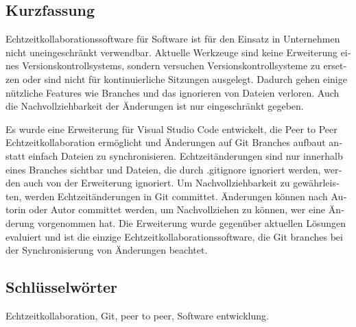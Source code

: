 
\cleardoublepage
{}




\begin{otherlanguage}{ngerman}

  \chapter*{Kurzfassung}

  Echtzeitkollaborationssoftware für Software ist für den Einsatz in Unternehmen nicht uneingeschränkt verwendbar. Aktuelle Werkzeuge sind keine Erweiterung eines Versionskontrollsystems, sondern versuchen Versionskontrollsysteme zu ersetzen oder sind nicht für kontinuierliche Sitzungen ausgelegt. Dadurch gehen einige nützliche Features wie Branches und das ignorieren von Dateien verloren. Auch die Nachvollziehbarkeit der Änderungen ist nur eingeschränkt gegeben.
  
  Es wurde eine Erweiterung für Visual Studio Code entwickelt, die Peer to Peer Echtzeitkollaboration ermöglicht und Änderungen auf Git Branches aufbaut anstatt einfach Dateien zu synchronisieren. Echtzeitänderungen sind nur innerhalb eines Branches sichtbar und Dateien, die durch .gitignore ignoriert werden, werden auch von der Erweiterung ignoriert. Um Nachvollziehbarkeit zu gewährleisten, werden Echtzeitänderungen in Git committet. Änderungen können nach Autorin oder Autor committet werden, um Nachvollziehen zu können, wer eine Änderung vorgenommen hat. Die Erweiterung wurde gegenüber aktuellen Lösungen evaluiert und ist die einzige Echtzeitkollaborationssoftware, die Git branches bei der Synchronisierung von Änderungen beachtet.

	

  \bigskip

  \section*{Schl\"usselw\"orter}
  Echtzeitkollaboration, Git, peer to peer,  Software entwicklung.

\end{otherlanguage}

